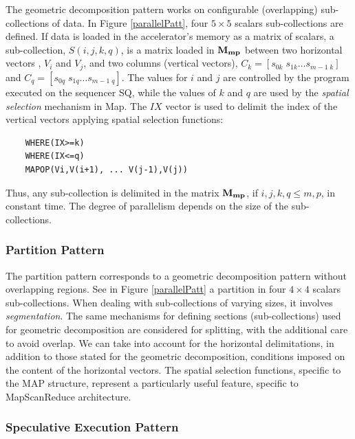 The geometric decomposition pattern works on configurable (overlapping) sub-collections  of data. In Figure \ref{parallelPatt}, four $5 \times 5$ scalars sub-collections are defined. If data is loaded in the accelerator's memory as a matrix of scalars, a sub-collection, $S(i,j,k,q)$, is a matrix loaded in ${\bf M_{mp}}$ between two horizontal vectors , $V_i$ and $V_j$, and two columns (vertical vectors), $C_k = [s_{0k} \; s_{1k} \ldots s_{m-1 \; k}]$ and $C_q = [s_{0q} \; s_{1q} \ldots s_{m-1 \; q}]$. The values for $i$ and $j$ are controlled by the program executed on the sequencer SQ, while the values of $k$ and $q$ are used by the {\em spatial selection} mechanism in Map. The $IX$ vector is used to delimit the index  of the vertical vectors applying spatial selection functions:
\begin{verbatim}
    WHERE(IX>=k)
    WHERE(IX<=q)
    MAPOP(Vi,V(i+1), ... V(j-1),V(j))
\end{verbatim}
Thus, any sub-collection is delimited in the matrix ${\bf M_{mp}}$, if $i,j,k,q \leq m,p$, in constant time. The degree of parallelism depends on the size of the sub-collections.

\subsubsection{Partition  Pattern}

The partition pattern corresponds to a geometric decomposition pattern without overlapping regions. See in Figure \ref{parallelPatt} a partition in four $4 \times 4$ scalars sub-collections. When dealing with sub-collections of varying sizes, it involves  {\em segmentation}. The same mechanisms for defining sections (sub-collections) used for geometric decomposition are considered for splitting, with the additional care to avoid overlap. We can take into account for the horizontal delimitations, in addition to those stated for the geometric decomposition, conditions imposed on the content of the horizontal vectors. The spatial selection functions, specific to the MAP structure, represent a particularly useful feature, specific to MapScanReduce architecture.

\subsubsection{Speculative Execution Pattern}

